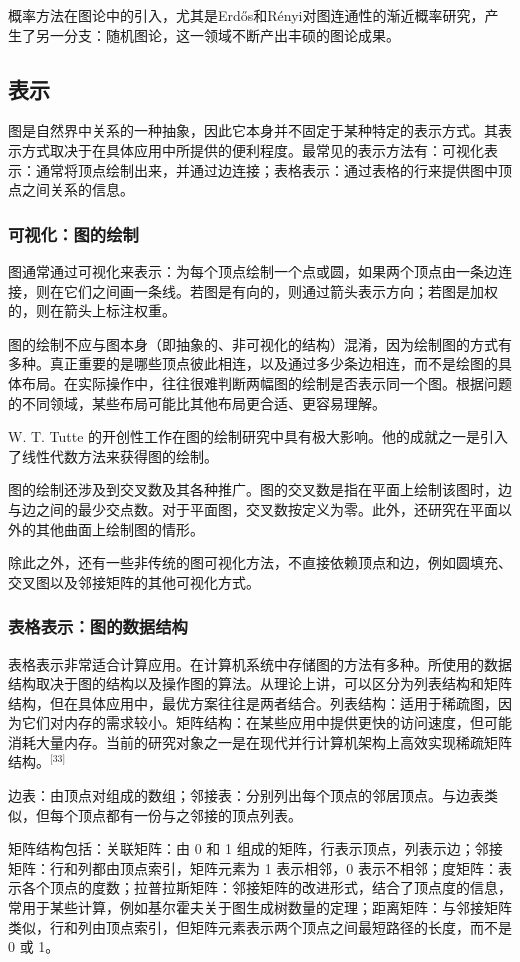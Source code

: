 概率方法在图论中的引入，尤其是Erdős和Rényi对图连通性的渐近概率研究，产生了另一分支：随机图论，这一领域不断产出丰硕的图论成果。
\subsection{表示}
图是自然界中关系的一种抽象，因此它本身并不固定于某种特定的表示方式。其表示方式取决于在具体应用中所提供的便利程度。最常见的表示方法有：可视化表示：通常将顶点绘制出来，并通过边连接；表格表示：通过表格的行来提供图中顶点之间关系的信息。
\subsubsection{可视化：图的绘制}
图通常通过可视化来表示：为每个顶点绘制一个点或圆，如果两个顶点由一条边连接，则在它们之间画一条线。若图是有向的，则通过箭头表示方向；若图是加权的，则在箭头上标注权重。

图的绘制不应与图本身（即抽象的、非可视化的结构）混淆，因为绘制图的方式有多种。真正重要的是哪些顶点彼此相连，以及通过多少条边相连，而不是绘图的具体布局。在实际操作中，往往很难判断两幅图的绘制是否表示同一个图。根据问题的不同领域，某些布局可能比其他布局更合适、更容易理解。

W. T. Tutte 的开创性工作在图的绘制研究中具有极大影响。他的成就之一是引入了线性代数方法来获得图的绘制。

图的绘制还涉及到交叉数及其各种推广。图的交叉数是指在平面上绘制该图时，边与边之间的最少交点数。对于平面图，交叉数按定义为零。此外，还研究在平面以外的其他曲面上绘制图的情形。

除此之外，还有一些非传统的图可视化方法，不直接依赖顶点和边，例如圆填充、交叉图以及邻接矩阵的其他可视化方式。
\subsubsection{表格表示：图的数据结构}
表格表示非常适合计算应用。在计算机系统中存储图的方法有多种。所使用的数据结构取决于图的结构以及操作图的算法。从理论上讲，可以区分为列表结构和矩阵结构，但在具体应用中，最优方案往往是两者结合。列表结构：适用于稀疏图，因为它们对内存的需求较小。矩阵结构：在某些应用中提供更快的访问速度，但可能消耗大量内存。当前的研究对象之一是在现代并行计算机架构上高效实现稀疏矩阵结构。\(^\text{[33]}\)

边表：由顶点对组成的数组；邻接表：分别列出每个顶点的邻居顶点。与边表类似，但每个顶点都有一份与之邻接的顶点列表。

矩阵结构包括：关联矩阵：由 0 和 1 组成的矩阵，行表示顶点，列表示边；邻接矩阵：行和列都由顶点索引，矩阵元素为 1 表示相邻，0 表示不相邻；度矩阵：表示各个顶点的度数；拉普拉斯矩阵：邻接矩阵的改进形式，结合了顶点度的信息，常用于某些计算，例如基尔霍夫关于图生成树数量的定理；距离矩阵：与邻接矩阵类似，行和列由顶点索引，但矩阵元素表示两个顶点之间最短路径的长度，而不是 0 或 1。
